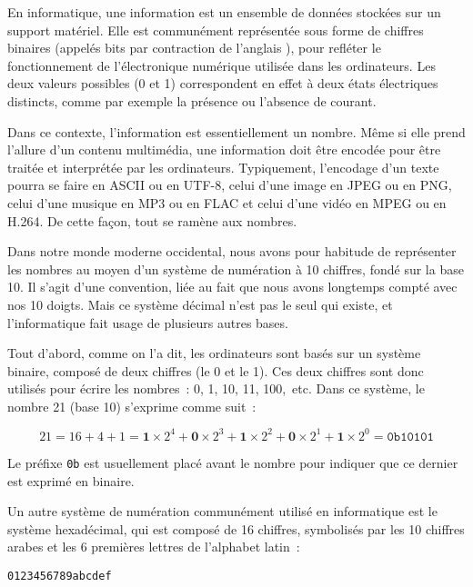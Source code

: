 En informatique, une information est un ensemble de données stockées sur un support matériel. Elle est communément représentée sous forme de chiffres binaires (appelés bits par contraction de l'anglais ), pour refléter le fonctionnement de l'électronique numérique utilisée dans les ordinateurs. Les deux valeurs possibles (0 et 1) correspondent en effet à deux états électriques distincts, comme par exemple la présence ou l'absence de courant. %

Dans ce contexte, l'information est essentiellement un nombre. Même si elle prend l'allure d'un contenu multimédia, une information doit être encodée pour être traitée et interprétée par les ordinateurs. Typiquement, l'encodage d'un texte pourra se faire en ASCII ou en UTF-8, celui d'une image en JPEG ou en PNG, celui d'une musique en MP3 ou en FLAC et celui d'une vidéo en MPEG ou en H.264. De cette façon, tout se ramène aux nombres.

Dans notre monde moderne occidental, nous avons pour habitude de représenter les nombres au moyen d'un système de numération à 10 chiffres, fondé sur la base 10. Il s'agit d'une convention, liée au fait que nous avons longtemps compté avec nos 10 doigts. Mais ce système décimal n'est pas le seul qui existe, et l'informatique fait usage de plusieurs autres bases.

Tout d'abord, comme on l'a dit, les ordinateurs sont basés sur un système binaire, composé de deux chiffres (le 0 et le 1). Ces deux chiffres sont donc utilisés pour écrire les nombres~: 0, 1, 10, 11, 100,~etc. Dans ce système, le nombre 21 (base 10) s'exprime comme suit~:

{ \small
\[
21 = 16 + 4 + 1 = \mathbf{1} \times 2^4 + \mathbf{0} \times 2^3 + \mathbf{1} \times 2^2 + \mathbf{0} \times 2^1 + \mathbf{1} \times 2^0 = \mathtt{0b10101}
\]
}

Le préfixe \texttt{0b} est usuellement placé avant le nombre pour indiquer que ce dernier est exprimé en binaire.


Un autre système de numération communément utilisé en informatique est le système hexadécimal, qui est composé de 16 chiffres, symbolisés par les 10 chiffres arabes et les 6 premières lettres de l'alphabet latin~: 

\begin{Verbatim}[fontsize=\small]
0123456789abcdef
\end{Verbatim}

